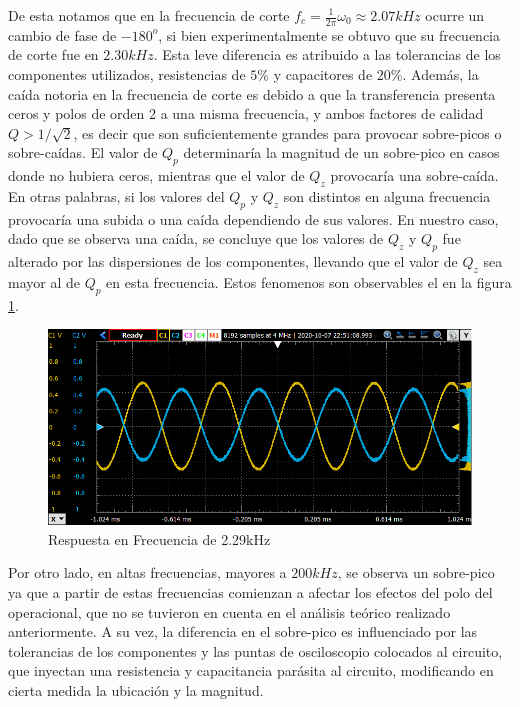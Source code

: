 De esta notamos que en la frecuencia de corte $f_c = \frac{1}{2\pi}\omega_0 \approx 2.07kHz$ ocurre un cambio de fase de $-180^o$, si bien experimentalmente se obtuvo que su frecuencia de corte fue en $2.30kHz$. Esta leve diferencia es atribuido a las tolerancias de los componentes utilizados, resistencias de $5\%$ y capacitores de $20\%$. Además, la caída notoria en la frecuencia de corte es debido a que la transferencia presenta ceros y polos de orden 2 a una misma frecuencia, y ambos factores de calidad $Q > 1/\sqrt{2}$, es decir que son suficientemente grandes para provocar sobre-picos o sobre-caídas. El valor de $Q_p$ determinaría la magnitud de un sobre-pico en casos donde no hubiera ceros, mientras que el valor de $Q_z$ provocaría una sobre-caída. En otras palabras, si los valores del $Q_p$ y $Q_z$ son distintos en alguna frecuencia provocaría una subida o una caída dependiendo de sus valores. En nuestro caso, dado que se observa una caída, se concluye que los valores de $Q_z$ y $Q_p$ fue alterado por las dispersiones de los componentes, llevando que el valor de $Q_z$ sea mayor al de $Q_p$ en esta frecuencia. Estos fenomenos son observables el en la figura \ref{ej1despha}.

\begin{figure}[h]
    \centering
    \includegraphics{../Ejercicio1-FiltroConGIC/Informe/desphaOsc.png}
    \caption{Respuesta en Frecuencia de 2.29kHz}
    \label{ej1despha}
\end{figure}

Por otro lado, en altas frecuencias, mayores a $200kHz$, se observa un sobre-pico ya que a partir de estas frecuencias comienzan a afectar los efectos del polo del operacional, que no se tuvieron en cuenta en el análisis teórico realizado anteriormente. A su vez, la diferencia en el sobre-pico es influenciado por las tolerancias de los componentes y las puntas de osciloscopio colocados al circuito, que inyectan una resistencia y capacitancia parásita al circuito, modificando en cierta medida la ubicación y la magnitud. 

